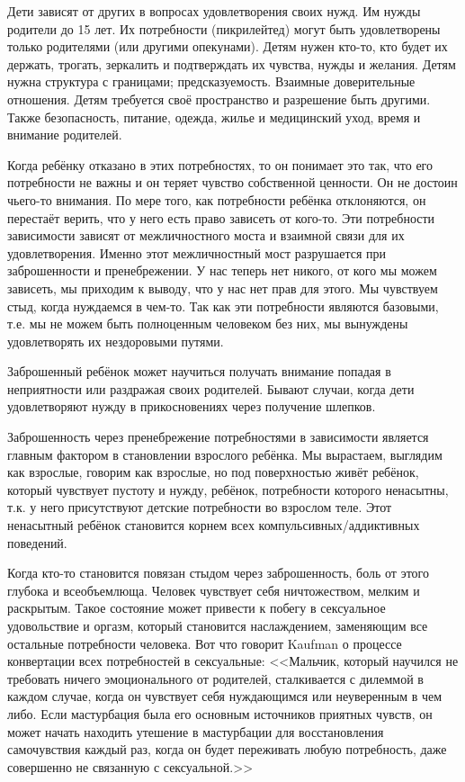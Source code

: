 \documentclass[10pt, fleqn]{article}
\begin{document}
Дети зависят от других в вопросах удовлетворения своих нужд. Им нужды родители до 15 лет. Их потребности (пикрилейтед) могут быть удовлетворены только родителями (или другими опекунами). Детям нужен кто-то, кто будет их держать, трогать, зеркалить и подтверждать их чувства, нужды и желания. Детям нужна структура с границами; предсказуемость. Взаимные доверительные отношения. Детям требуется своё пространство и разрешение быть другими. Также безопасность, питание, одежда, жилье и медицинский уход, время и внимание родителей.


Когда ребёнку отказано в этих потребностях, то он понимает это так, что его потребности не важны и он теряет чувство собственной ценности. Он не достоин чьего-то внимания. По мере того, как потребности ребёнка отклоняются, он перестаёт верить, что у него есть право зависеть от кого-то. Эти потребности зависимости зависят от межличностного моста и взаимной связи для их удовлетворения. Именно этот межличностный мост разрушается при заброшенности и пренебрежении. У нас теперь нет никого, от кого мы можем зависеть, мы приходим к выводу, что у нас нет прав для этого. Мы чувствуем стыд, когда нуждаемся в чем-то. Так как эти потребности являются базовыми, т.е. мы не можем быть полноценным человеком без них, мы вынуждены удовлетворять их нездоровыми путями.

Заброшенный ребёнок может научиться получать внимание попадая в неприятности или раздражая своих родителей. Бывают случаи, когда дети удовлетворяют нужду в прикосновениях через получение шлепков.

Заброшенность через пренебрежение потребностями в зависимости является главным фактором в становлении взрослого ребёнка. Мы вырастаем, выглядим как взрослые, говорим как взрослые, но под поверхностью живёт ребёнок, который чувствует пустоту и нужду, ребёнок, потребности которого ненасытны, т.к. у него присутствуют детские потребности во взрослом теле. Этот ненасытный ребёнок становится корнем всех компульсивных/аддиктивных поведений.

Когда кто-то становится повязан стыдом через заброшенность, боль от этого глубока и всеобъемлюща. Человек чувствует себя ничтожеством, мелким и раскрытым. Такое состояние может привести к побегу в сексуальное удовольствие и оргазм, который становится наслаждением, заменяющим все остальные потребности человека.
Вот что говорит Kaufman о процессе конвертации всех потребностей в сексуальные:
<<Мальчик, который научился не требовать ничего эмоционального от родителей, сталкивается с дилеммой в каждом случае, когда он чувствует себя нуждающимся или неуверенным в чем либо. Если мастурбация была его основным источников приятных чувств, он может начать находить утешение в мастурбации для восстановления самочувствия каждый раз, когда он будет переживать любую потребность, даже совершенно не связанную с сексуальной.>>
\end{document}
